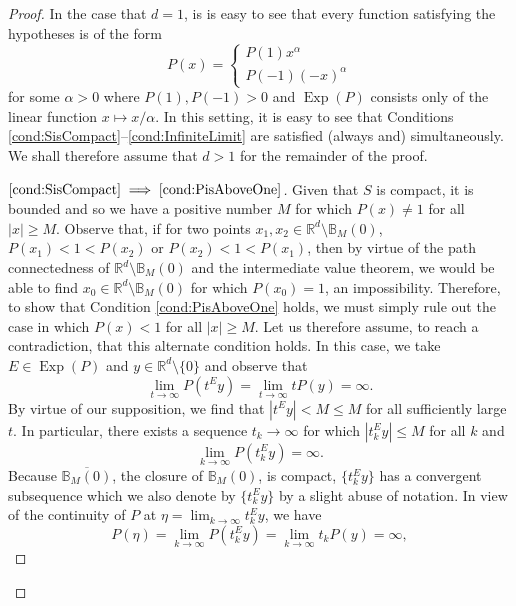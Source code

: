 \documentclass[11pt]{article}
\theoremstyle{theorem}
\newcommand*{\myproofname}{Proof}
\newenvironment{subproof}[1][\myproofname]{\begin{proof}[#1]\renewcommand*{\qedsymbol}{$\mathbin{/\mkern-6mu/}$}}{\end{proof}}
\newcommand\Exp{\operatorname{Exp}}
\begin{document}
\begin{proof}
In the case that $d=1$, is is easy to see that every function satisfying the hypotheses is of the form
\begin{equation*}
P(x)=\begin{cases}
P(1)x^\alpha \\
P(-1)(-x)^\alpha
\end{cases}
\end{equation*}
for some $\alpha>0$ where $P(1),P(-1)>0$ and $\Exp(P)$ consists only of the linear function $x\mapsto x/\alpha$. In this setting, it is easy to see that Conditions \ref{cond:SisCompact}--\ref{cond:InfiniteLimit} are satisfied (always and) simultaneously. We shall therefore assume that $d>1$ for the remainder of the proof.

\begin{subproof}[$\ref{cond:SisCompact}\implies\ref{cond:PisAboveOne}$]
Given that $S$ is compact, it is bounded and so we have a positive number $M$ for which $P(x)\neq 1$ for all $|x|\geq M$. Observe that, if for two points $x_1,x_2\in \mathbb{R}^d\setminus\mathbb{B}_M(0)$, $P(x_1)<1<P(x_2)$ or $P(x_2)<1<P(x_1)$, then by virtue of the path connectedness of $\mathbb{R}^d\setminus\mathbb{B}_M(0)$ and the intermediate value theorem, we would be able to find  $x_0\in\mathbb{R}^d\setminus\mathbb{B}_M(0)$ for which $P(x_0)=1$, an impossibility. Therefore, to show that Condition \ref{cond:PisAboveOne} holds, we must simply rule out the case in which $P(x)<1$ for all $|x|\geq M$. Let us therefore assume, to reach a contradiction, that this alternate condition holds. In this case, we take $E\in\Exp(P)$ and $y\in\mathbb{R}^d\setminus \{0\}$ and observe that
\begin{equation*}
\lim_{t\to\infty}P(t^Ey)=\lim_{t\to\infty}tP(y)=\infty.
\end{equation*}
By virtue of our supposition, we find that $|t^Ey|<M\leq M$ for all sufficiently large $t$. In particular, there exists a sequence $t_k\to\infty$ for which $|t_k^Ey|\leq M$ for all $k$ and 
\begin{equation*}
\lim_{k\to\infty}P(t_k^Ey)=\infty.
\end{equation*}
Because $\overline{\mathbb{B}_M(0)}$, the closure of $\mathbb{B}_M(0)$, is compact, $\{t_k^Ey\}$ has a convergent subsequence which we also denote by $\{t_k^Ey\}$ by a slight abuse of notation. In view of the continuity of $P$ at $\eta=\lim_{k\to\infty}t_k^Ey$, we have
\begin{equation*}
P(\eta)=\lim_{k\to\infty}P(t_k^Ey)=\lim_{k\to\infty}t_kP(y)=\infty,

\end{equation*}
\end{subproof}
\end{proof}
\end{document}
